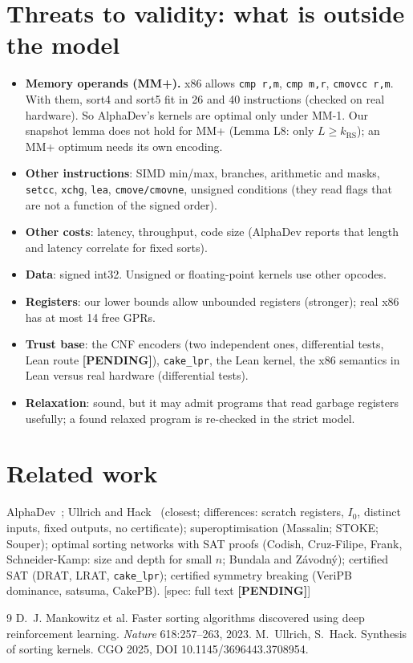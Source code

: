 \documentclass[11pt]{article}
\theoremstyle{remark}\newtheorem{remark}[theorem]{Remark}
\newcommand{\pending}{\textbf{[PENDING]}}
\begin{document}
\section{Threats to validity: what is outside the model}\label{sec:threats}
\begin{itemize}
\item \textbf{Memory operands (MM+).} x86 allows \texttt{cmp r,m}, \texttt{cmp m,r}, \texttt{cmovcc r,m}. With them, sort4 and sort5
fit in 26 and 40 instructions (checked on real hardware). So AlphaDev's kernels are optimal only under MM-1. Our snapshot
lemma does not hold for MM+ (Lemma L8: only $L \ge k_{\mathrm{RS}}$); an MM+ optimum needs its own encoding.
\item \textbf{Other instructions}: SIMD min/max, branches, arithmetic and masks, \texttt{setcc}, \texttt{xchg}, \texttt{lea},
\texttt{cmove/cmovne}, unsigned conditions (they read flags that are not a function of the signed order).
\item \textbf{Other costs}: latency, throughput, code size (AlphaDev reports that length and latency correlate for fixed sorts).
\item \textbf{Data}: signed int32. Unsigned or floating-point kernels use other opcodes.
\item \textbf{Registers}: our lower bounds allow unbounded registers (stronger); real x86 has at most 14 free GPRs.
\item \textbf{Trust base}: the CNF encoders (two independent ones, differential tests, Lean route \pending), \texttt{cake\_lpr},
the Lean kernel, the x86 semantics in Lean versus real hardware (differential tests).
\item \textbf{Relaxation}: sound, but it may admit programs that read garbage registers usefully; a found relaxed program is
re-checked in the strict model.
\end{itemize}

\section{Related work}
AlphaDev~\cite{alphadev}; Ullrich and Hack~\cite{ullrich} (closest; differences: scratch registers, $I_0$, distinct inputs,
fixed outputs, no certificate); superoptimisation (Massalin; STOKE; Souper); optimal sorting networks with SAT proofs (Codish,
Cruz-Filipe, Frank, Schneider-Kamp: size and depth for small $n$; Bundala and Z\'avodn\'y); certified SAT (DRAT, LRAT,
\texttt{cake\_lpr}); certified symmetry breaking (VeriPB dominance, satsuma, CakePB). [spec: full text \pending]

\appendix


\begin{thebibliography}{9}
 D.~J. Mankowitz et al. Faster sorting algorithms discovered using deep reinforcement learning.
\emph{Nature} 618:257--263, 2023.
 M.~Ullrich, S.~Hack. Synthesis of sorting kernels. CGO 2025, DOI 10.1145/3696443.3708954.
\end{thebibliography}
\end{document}

